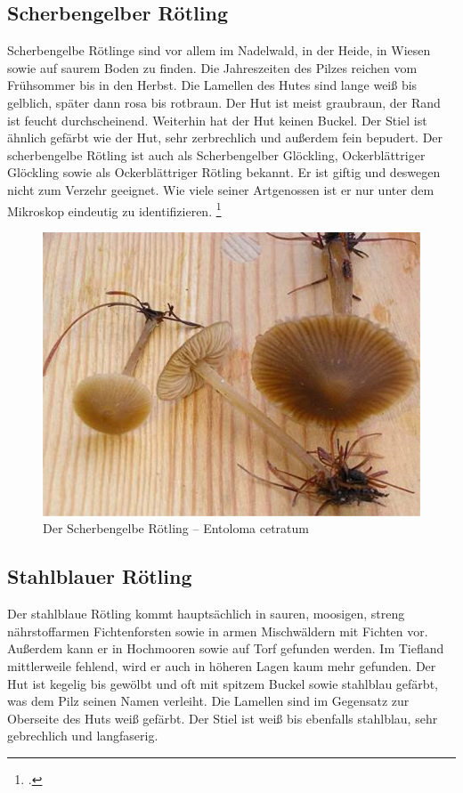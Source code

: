 \documentclass[a4paper,abstracton]{scrreprt}
\begin{document}
\subsection{Scherbengelber Rötling}
Scherbengelbe Rötlinge sind vor allem im Nadelwald, in der Heide, in Wiesen sowie auf saurem Boden zu finden. Die Jahreszeiten des Pilzes reichen vom Frühsommer bis in den Herbst. Die Lamellen des Hutes sind lange weiß bis gelblich, später dann rosa bis rotbraun. Der Hut ist meist graubraun, der Rand ist feucht durchscheinend. Weiterhin hat der Hut keinen Buckel. Der Stiel ist ähnlich gefärbt wie der Hut, sehr zerbrechlich und außerdem fein bepudert.
Der scherbengelbe Rötling ist auch als Scherbengelber Glöckling, Ockerblättriger Glöckling sowie als Ockerblättriger Rötling bekannt. Er ist giftig und deswegen nicht zum Verzehr geeignet. Wie viele seiner Artgenossen ist er nur unter dem Mikroskop eindeutig zu identifizieren.
\footcite{scherbengelb}
\begin{figure}[H]
\centering
\includegraphics[scale=0.3]{scherbengelb}
\caption{Der Scherbengelbe Rötling -- Entoloma cetratum }
\label{fig:scherbengelb}
\end{figure}

\subsection{Stahlblauer Rötling}
Der stahlblaue Rötling kommt hauptsächlich in sauren, moosigen, streng nährstoffarmen Fichtenforsten sowie in armen Mischwäldern mit Fichten vor. Außerdem kann er in Hochmooren sowie auf Torf gefunden werden. Im Tiefland mittlerweile fehlend, wird er auch in höheren Lagen kaum mehr gefunden.
Der Hut ist kegelig bis gewölbt und oft mit spitzem Buckel sowie stahlblau gefärbt, was dem Pilz seinen Namen verleiht. Die Lamellen sind im Gegensatz zur Oberseite des Huts weiß gefärbt. Der Stiel ist weiß bis ebenfalls stahlblau, sehr gebrechlich und langfaserig.
\end{document}
